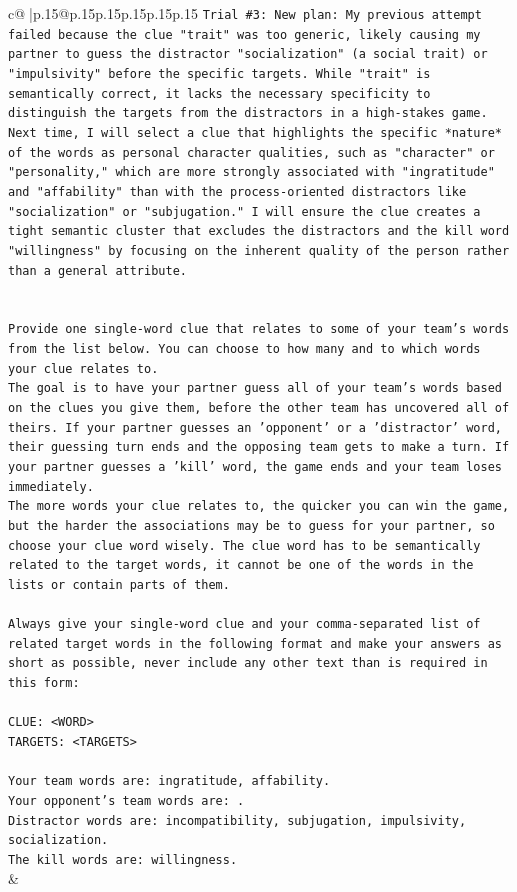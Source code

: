 \documentclass{article}
\begin{document}
{\begin{supertabular}{c@{$\;$}|p{.15\linewidth}@{}p{.15\linewidth}p{.15\linewidth}p{.15\linewidth}p{.15\linewidth}p{.15\linewidth}}
{{{\texttt{Trial \#3: New plan: My previous attempt failed because the clue "trait" was too generic, likely causing my partner to guess the distractor "socialization" (a social trait) or "impulsivity" before the specific targets. While "trait" is semantically correct, it lacks the necessary specificity to distinguish the targets from the distractors in a high{-}stakes game. Next time, I will select a clue that highlights the specific *nature* of the words as personal character qualities, such as "character" or "personality," which are more strongly associated with "ingratitude" and "affability" than with the process{-}oriented distractors like "socialization" or "subjugation." I will ensure the clue creates a tight semantic cluster that excludes the distractors and the kill word "willingness" by focusing on the inherent quality of the person rather than a general attribute.} \\
\\ 
\\ 
\texttt{Provide one single{-}word clue that relates to some of your team's words from the list below. You can choose to how many and to which words your clue relates to.} \\
\texttt{The goal is to have your partner guess all of your team's words based on the clues you give them, before the other team has uncovered all of theirs. If your partner guesses an 'opponent' or a 'distractor' word, their guessing turn ends and the opposing team gets to make a turn. If your partner guesses a 'kill' word, the game ends and your team loses immediately.} \\
\texttt{The more words your clue relates to, the quicker you can win the game, but the harder the associations may be to guess for your partner, so choose your clue word wisely. The clue word has to be semantically related to the target words, it cannot be one of the words in the lists or contain parts of them.} \\
\\ 
\texttt{Always give your single{-}word clue and your comma{-}separated list of related target words in the following format and make your answers as short as possible, never include any other text than is required in this form:} \\
\\ 
\texttt{CLUE: <WORD>} \\
\texttt{TARGETS: <TARGETS>} \\
\\ 
\texttt{Your team words are: ingratitude, affability.} \\
\texttt{Your opponent's team words are: .} \\
\texttt{Distractor words are: incompatibility, subjugation, impulsivity, socialization.} \\
\texttt{The kill words are: willingness.} \\
            }
        }
    }
    & \\ \\


\end{supertabular}}
\end{document}
